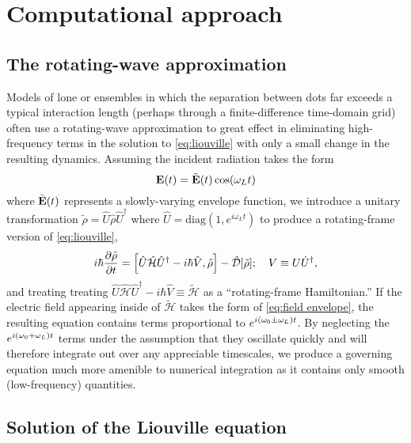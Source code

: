 \section{Computational approach}

\subsection{The rotating-wave approximation}

Models of lone \qds{} or \qd{} ensembles in which the separation between dots far exceeds a typical interaction length (perhaps through a finite-difference time-domain grid) often use a rotating-wave approximation to great effect in eliminating high-frequency terms in the solution to \cref{eq:liouville} with only a small change in the resulting dynamics.
Assuming the incident radiation takes the form
\begin{equation}
  \vb{E}(t) = \tilde{\vb{E}}(t) \cos(\omega_L t)
  \label{eq:field envelope}
\end{equation}
where $\tilde{\vb{E}}(t)$ represents a slowly-varying envelope function, we introduce a unitary transformation $\tilde{\rho} = \hat{U} \hat{\rho} \hat{U}^\dagger$ where $\hat{U} = \mathrm{diag}(1, e^{i \omega_L t})$ to produce a rotating-frame version of \cref{eq:liouville},
\begin{equation}
  i \hbar \pdv{\tilde{\rho}}{t} = \commutator{\hat{U} \hat{\mathcal{H}} \hat{U}^\dagger - i \hbar \hat{V}}{\tilde{\rho}} - \hat{\mathcal{D}}\qty[\tilde{\rho}]; \quad V \equiv U \dot{U}^\dagger,
  \label{eq:rotating liouville}
\end{equation}
and treating treating $\hat{U} \hat{\mathcal{H}} \hat{U}^\dagger - i \hbar \hat{V} \equiv \tilde{\mathcal{H}}$ as a ``rotating-frame Hamiltonian.''
If the electric field appearing inside of $\tilde{\mathcal{H}}$ takes the form of \cref{eq:field envelope}, the resulting equation contains terms proportional to $e^{i \qty(\omega_0 \pm \omega_L) t}$.
By neglecting the $e^{i \qty(\omega_0 + \omega_L) t}$ terms under the assumption that they oscillate quickly and will therefore integrate out over any appreciable timescales, we produce a governing equation much more amenible to numerical integration as it contains only smooth (low-frequency) quantities.


\subsection{Solution of the Liouville equation}

